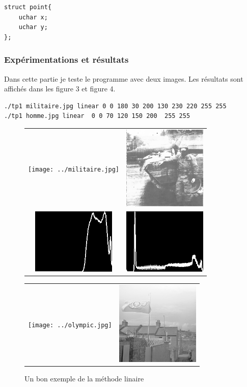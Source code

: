 \documentclass[paper=a4, fontsize=11pt]{scrartcl}	%
\begin{document}
\begin{lstlisting}[label=point,caption=la structure point]
struct point{
    uchar x;
    uchar y;
};
\end{lstlisting}
\subsubsection*{Expérimentations et résultats}
Dans cette partie je teste le programme avec deux images. Les résultats sont affichés dans les figure 3 et figure 4.
\begin{lstlisting}
./tp1 militaire.jpg linear 0 0 180 30 200 130 230 220 255 255
./tp1 homme.jpg linear  0 0 70 120 150 200  255 255
\end{lstlisting}
\begin{figure}[htp]
	\begin{center}
		\begin{tabular}[h]{cc}
		\texttt{[image: ../militaire.jpg]}&
		\includegraphics[width=4cm]{images/linearMili.jpg} \\	
		\includegraphics[width=4cm]{images/histMiliAvant.jpg}&
		\includegraphics[width=4cm]{images/histMili.jpg}	
		\end{tabular}
			\caption{Un bon exemple de la méthode linaire}
		\begin{tabular}[h]{cc}
		\texttt{[image: ../olympic.jpg]}&
		\includegraphics[width=4cm]{images/olym.jpg} \\	

\end{tabular}
\end{center}
\end{figure}
\end{document}
